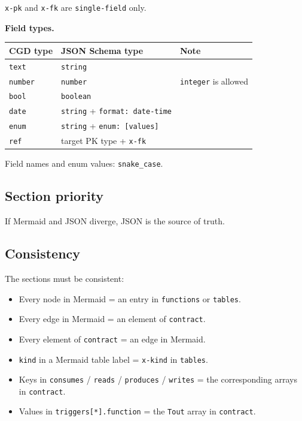 \texttt{x-pk} and \texttt{x-fk} are \texttt{single-field} only.

\vspace{0.5em}
\noindent\textbf{Field types.}
\vspace{0.5em}

\begin{tabular}{lll}
\hline
\textbf{CGD type} & \textbf{JSON Schema type} & \textbf{Note} \\
\hline
\texttt{text} & \texttt{string} & \\
\texttt{number} & \texttt{number} & \texttt{integer} is allowed \\
\texttt{bool} & \texttt{boolean} & \\
\texttt{date} & \texttt{string} + \texttt{format: date-time} & \\
\texttt{enum} & \texttt{string} + \texttt{enum: [values]} & \\
\texttt{ref} & target PK type + \texttt{x-fk} & \\
\hline
\end{tabular}

\vspace{0.5em}
Field names and enum values: \texttt{snake\_case}.

\subsection{Section priority}

If Mermaid and JSON diverge, JSON is the source of truth.

\subsection{Consistency}

The sections must be consistent:

\begin{itemize}
\item Every node in Mermaid = an entry in \texttt{functions} or \texttt{tables}.
\item Every edge in Mermaid = an element of \texttt{contract}.
\item Every element of \texttt{contract} = an edge in Mermaid.
\item \texttt{kind} in a Mermaid table label = \texttt{x-kind} in \texttt{tables}.
\item Keys in \texttt{consumes} / \texttt{reads} / \texttt{produces} / \texttt{writes} = the corresponding arrays in \texttt{contract}.
\item Values in \texttt{triggers[*].function} = the \texttt{Tout} array in \texttt{contract}.
\end{itemize}
